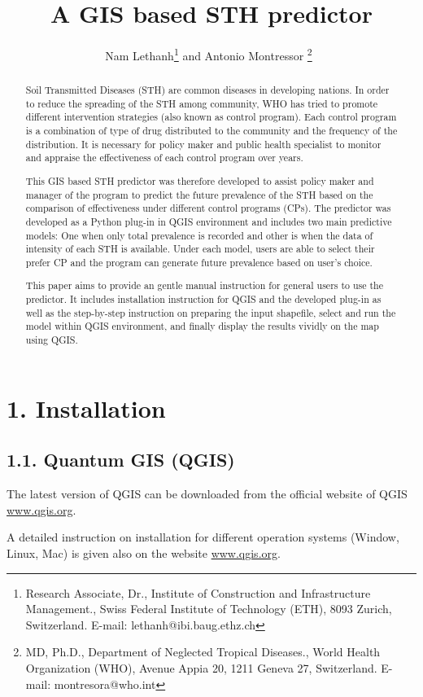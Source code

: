 \documentclass[12pt,oneside]{memoir}
\title{A GIS based STH predictor}
\author{
Nam Lethanh\thanks{Research Associate, Dr., Institute of Construction and Infrastructure Management., Swiss Federal 
Institute of Technology (ETH), 8093 Zurich, Switzerland. E-mail: lethanh@ibi.baug.ethz.ch} and Antonio Montressor%
\thanks{MD, Ph.D., Department of Neglected Tropical Diseases., World Health Organization (WHO), Avenue Appia 20, 1211 Geneva 27, Switzerland. E-mail: montresora@who.int}\
}
\begin{document}
\maketitle
\begin{abstract}
Soil Transmitted Diseases (STH) are common diseases in developing nations. In order to reduce the spreading of the STH among community, WHO has tried to promote different intervention strategies (also known as control program). Each control program is a combination of type of drug distributed to the community and the frequency of the distribution. It is necessary for policy maker and public health specialist to monitor and appraise the effectiveness of each control program over years. 

This GIS based STH predictor was therefore developed to assist policy maker and manager of the program to predict the future prevalence of the STH based on the comparison of effectiveness under different control programs (CPs). The predictor was developed as a Python plug-in in QGIS environment and includes two main predictive models: One when only total prevalence is recorded and other is when the data of intensity of each STH is available. Under each model, users are able to select their prefer CP and the program can generate future prevalence based on user's choice.

This paper aims to provide an gentle manual instruction for general users to use the predictor. It includes installation instruction for QGIS and the developed plug-in as well as the step-by-step instruction on preparing the input shapefile, select and run the model within QGIS environment, and finally display the results vividly on the map using QGIS.
\end{abstract}

\section*{1. Installation}
\subsection{1.1. Quantum GIS (QGIS)}
The latest version of QGIS can be downloaded from the official website of QGIS \href{www.qgis.org}{www.qgis.org}.

A detailed instruction on installation for different operation systems (Window, Linux, Mac) is given also on the website \href{www.qgis.org}{www.qgis.org}. 
\end{document}
